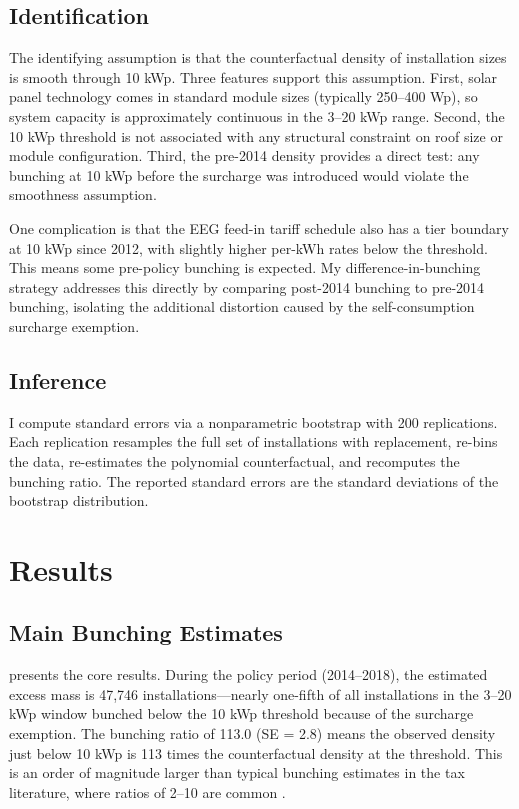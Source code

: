 \documentclass[12pt]{article}
\begin{document}
\subsection{Identification}

The identifying assumption is that the counterfactual density of installation sizes is smooth through 10 kWp. Three features support this assumption. First, solar panel technology comes in standard module sizes (typically 250--400 Wp), so system capacity is approximately continuous in the 3--20 kWp range. Second, the 10 kWp threshold is not associated with any structural constraint on roof size or module configuration. Third, the pre-2014 density provides a direct test: any bunching at 10 kWp before the surcharge was introduced would violate the smoothness assumption.

One complication is that the EEG feed-in tariff schedule also has a tier boundary at 10 kWp since 2012, with slightly higher per-kWh rates below the threshold. This means some pre-policy bunching is expected. My difference-in-bunching strategy addresses this directly by comparing post-2014 bunching to pre-2014 bunching, isolating the additional distortion caused by the self-consumption surcharge exemption.

\subsection{Inference}

I compute standard errors via a nonparametric bootstrap with 200 replications. Each replication resamples the full set of installations with replacement, re-bins the data, re-estimates the polynomial counterfactual, and recomputes the bunching ratio. The reported standard errors are the standard deviations of the bootstrap distribution.


\section{Results}

\subsection{Main Bunching Estimates}

 presents the core results. During the policy period (2014--2018), the estimated excess mass is 47,746 installations---nearly one-fifth of all installations in the 3--20 kWp window bunched below the 10 kWp threshold because of the surcharge exemption. The bunching ratio of 113.0 (SE = 2.8) means the observed density just below 10 kWp is 113 times the counterfactual density at the threshold. This is an order of magnitude larger than typical bunching estimates in the tax literature, where ratios of 2--10 are common \citep{kleven2016bunching}.
\end{document}
